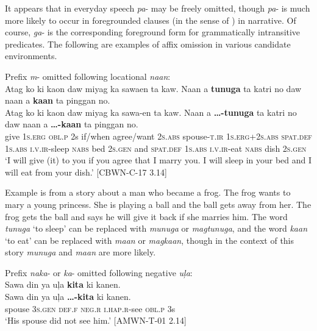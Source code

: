 It appears that in everyday speech \textit{pa}{}- may be freely omitted, though \textit{pa}{}- is much more likely to occur in foregrounded clauses (in the sense of \citealt{hopper1980}) in narrative. Of course, \textit{ga}{}- is the corresponding foreground form for grammatically intransitive predicates. The following are examples of affix omission in various candidate environments.

\ea
\label{ex:yourdish}
Prefix \textit{m}{}- omitted following locational \textit{naan}: \\
Atag  ko  ki  kaon  daw  miyag  ka  sawaen  ta  kaw. Naan  a  \textbf{tunuga}  ta  katri  no  daw  naan  a  \textbf{kaan} ta  pinggan  no. \\\smallskip
 \gll Atag  ko  ki  kaon  daw  miyag  ka  sawa-en  ta  kaw. Naan  a  \textbf{…-tunuga}  ta  katri  no  daw  naan  a  \textbf{…-kaan} ta  pinggan  no. \\
give  1\textsc{s.erg}  \textsc{obl.p}  2s  if/when  agree/want  2\textsc{s.abs}  spouse-\textsc{t.ir}  1\textsc{s.erg+}2\textsc{s.abs}
\textsc{spat.def}  1\textsc{s.abs}  \textsc{i.v.ir}-sleep  \textsc{nabs}  bed  2\textsc{s.gen}  and  \textsc{spat.def}  1\textsc{s.abs}  \textsc{i.v.ir}-eat
\textsc{nabs}  dish  2\textsc{s.gen} \\
\glt `I will give (it) to you if you agree that I marry you. I will sleep in your bed and I will eat from your dish.’ [CBWN-C-17 3.14] 
\z

Example  is from a story about a man who became a frog. The frog wants to mary a young princess. She is playing a ball and the ball gets away from her. The frog gets the ball and says he will give it back if she marries him. The word \textit{tunuga} ‘to sleep’ can be replaced with \textit{munuga} or \textit{magtunuga}, and the word \textit{kaan} ‘to eat’ can be replaced with \textit{maan} or \textit{magkaan}, though in the context of this story \textit{munuga} and \textit{maan} are more likely. 

\ea
\label{spouse}
Prefix \textit{naka}{}- or \textit{ka}{}- omitted following negative \textit{uļa}: \\
Sawa  din  ya  uļa  \textbf{kita}  ki  kanen. \\\smallskip
 \gll Sawa  din  ya  uļa  \textbf{…-kita}  ki  kanen. \\
spouse  3\textsc{s.gen}  \textsc{def.f}  \textsc{neg.r}  \textsc{i.hap.r}-see  \textsc{obl.p}  3s \\
\glt ‘His spouse did not see him.’ [AMWN-T-01 2.14]
\z

